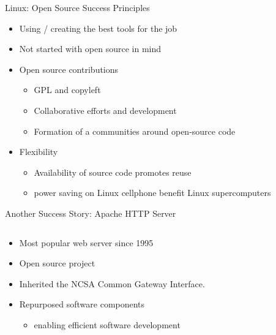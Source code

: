 


\begin{frame}{Linux: Open Source Success Principles}
  \begin{itemize}
    \item Using / creating the best tools for the job
    \item Not started with open source in mind~\cite[3:30]{torvalds}
    \item Open source contributions
      \begin{itemize}
        \item GPL and copyleft
        \item Collaborative efforts and development
        \item Formation of a communities around open-source code
      \end{itemize}
    \item Flexibility
      \begin{itemize}
        \item Availability of source code promotes reuse
        \item power saving on Linux cellphone benefit Linux supercomputers~\cite[11:34]{zemlin}
      \end{itemize}
  \end{itemize}
\end{frame}



\begin{frame}{Another Success Story: Apache HTTP Server}
  \begin{column}{.5\textwidth}
    \begin{itemize}
      \item Most popular web server since 1995
      \item Open source project
      \item Inherited the NCSA Common Gateway Interface.
      \item Repurposed software components
        \begin{itemize}
          \item enabling efficient software development~\cite[p. 17]{bisson}
        \end{itemize}
    \end{itemize}
  \end{column}
  \begin{column}{0.5\textwidth}\raggedleft{}
    \begin{figure}
      \def\svgwidth{0.5\columnwidth}
      
      \caption{\Protect\cite{apache}}
    \end{figure}
  \end{column}
\end{frame}

